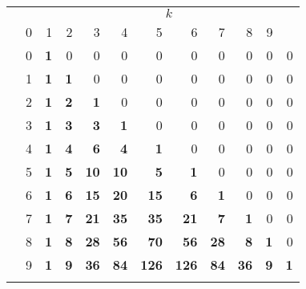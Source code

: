 \documentclass[10pt]{article}
\begin{document}
\TeXtoEPS
\begin{tabular}{||c|c||rrrrrrrrrr||}
\hhline{~~|t:==========:t|}
\multicolumn{1}{c}{} &   & \multicolumn{10}{c||}{\(k\)}\\
\hhline{~~||----------||}
\multicolumn{2}{c||}{\raisebox{1.9ex}[0cm][0cm]{\(\dbinom{r}{k}\)}}
          & 0 & 1 & 2 & 3 & 4 & 5 & 6 & 7 & 8 & 9\\
\hhline{|t:==::==========:|}
\multirow{10}{1.7mm}{\(r\)}
      & 0 & \textbf{1} & 0 &  0 &  0 &   0 &   0 &  0 &  0 & 0 & 0\\
      & 1 & \textbf{1} & \textbf{1} &  0 &  0 &   0 &   0 &  0 &  0 & 0 & 0\\
      & 2 & \textbf{1} & \textbf{2} &  \textbf{1} &  0 &   0 &   0 &  0 &  0 & 0 & 0\\
      & 3 & \textbf{1} & \textbf{3} &  \textbf{3} &  \textbf{1} &   0 &   0 &  0 &  0 & 0 & 0\\
      & 4 & \textbf{1} & \textbf{4} &  \textbf{6} &  \textbf{4} &   \textbf{1} &   0 &  0 &  0 & 0 & 0\\
      & 5 & \textbf{1} & \textbf{5} & \textbf{10} & \textbf{10} &   \textbf{5} &   \textbf{1} &  0 &  0 & 0 & 0\\
      & 6 & \textbf{1} & \textbf{6} & \textbf{15} & \textbf{20} &  \textbf{15} &   \textbf{6} &  \textbf{1} &  0 & 0 & 0\\
      & 7 & \textbf{1} & \textbf{7} & \textbf{21} & \textbf{35} &  \textbf{35} &  \textbf{21} &  \textbf{7} &  \textbf{1} & 0 & 0\\
      & 8 & \textbf{1} & \textbf{8} & \textbf{28} & \textbf{56} &  \textbf{70} &  \textbf{56} & \textbf{28} &  \textbf{8} & \textbf{1} & 0\\
      & 9 & \textbf{1} & \textbf{9} & \textbf{36} & \textbf{84} & \textbf{126} & \textbf{126} & \textbf{84} & \textbf{36} & \textbf{9} & \textbf{1}\\
\hhline{|b:==:b:==========:b|}
\end{tabular}
\endTeXtoEPS
\end{document}
